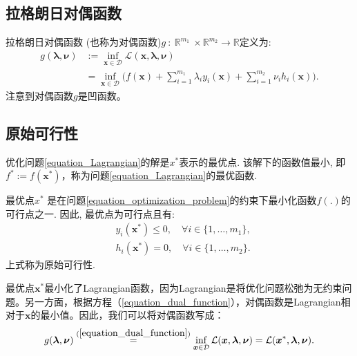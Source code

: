 \documentclass[lang=cn,10pt]{gorgeousnbook}
\numberwithin{equation}{section}%
\numberwithin{figure}{section}%
\begin{document}
\subsection{拉格朗日对偶函数}

\begin{definition}
拉格朗日对偶函数 (也称为对偶函数)$g~:~\mathbb{R}^{m_1}~\times \mathbb{R}^{m_2}\to\mathbb{R}$定义为:
\begin{equation}\label{equation_dual_function}
\begin{aligned}
  g(\boldsymbol\lambda,\boldsymbol\nu)& :=\inf_{\boldsymbol{x}\in\mathcal{D}}\mathcal{L}(\boldsymbol{x},\boldsymbol{\lambda},\boldsymbol{\nu})  \\
&=\inf_{\boldsymbol{x}\in\mathcal{D}}\Big(f(\boldsymbol{x})+\sum_{i=1}^{m_1}\lambda_iy_i(\boldsymbol{x})+\sum_{i=1}^{m_2}\nu_i h_i(\boldsymbol{x})\Big).
  \end{aligned}
\end{equation}
注意到对偶函数$g$是凹函数。
\end{definition}

\subsection{原始可行性}

\begin{definition}
优化问题\eqref{equation_Lagrangian}的解是$x^*$表示的最优点. 该解下的函数值最小, 即$f^* := f(\boldsymbol{x}^*)$，称为问题\eqref{equation_Lagrangian}的最优函数.
\end{definition}
最优点$x^*$ 是在问题\eqref{equation_optimization_problem}的约束下最小化函数$ f(.) $的可行点之一.
因此, 最优点为可行点且有:
\begin{align}
& y_i(\boldsymbol{x}^*) \leq 0, \quad \forall i \in \{1, \ldots, m_1\}, \\
& h_i(\boldsymbol{x}^*) = 0, \quad \forall i \in \{1, \ldots, m_2\}.
\end{align}
上式称为原始可行性. 

最优点$\boldsymbol{x}^*$最小化了Lagrangian函数，因为Lagrangian是将优化问题松弛为无约束问题。另一方面，根据方程（\ref{equation_dual_function}），对偶函数是Lagrangian相对于$\boldsymbol{x}$的最小值。因此，我们可以将对偶函数写成：
\begin{equation}\label{equation_dual_function_2}
\begin{aligned}
g(\boldsymbol{\lambda}, \boldsymbol{\nu}) \overset{(\ref{equation_dual_function})}{=} \inf_{\boldsymbol{x} \in \mathcal{D}} \mathcal{L}(\boldsymbol{x},\boldsymbol{\lambda},\boldsymbol{\nu}) = \mathcal{L}(\boldsymbol{x}^*,\boldsymbol{\lambda},\boldsymbol{\nu}).
\end{aligned}
\end{equation}
\end{document}
